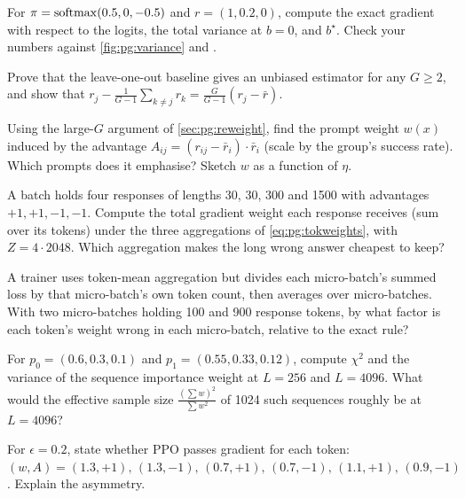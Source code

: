 \begin{exercise}
For $\pi=\operatorname{softmax}(0.5,0,-0.5)$ and $r=(1,0.2,0)$, compute the exact gradient with respect to the
logits, the total variance at $b=0$, and $b^\star$. Check your numbers against
\cref{fig:pg:variance} and .
\end{exercise}

\begin{exercise}
Prove that the leave-one-out baseline gives an unbiased estimator for any $G\ge2$, and show that
$r_j-\frac{1}{G-1}\sum_{k\ne j}r_k=\frac{G}{G-1}(r_j-\bar r)$.
\end{exercise}

\begin{exercise}
Using the large-$G$ argument of \cref{sec:pg:reweight}, find the prompt weight $w(x)$ induced by
the advantage $A_{ij}=(r_{ij}-\bar r_i)\cdot\bar r_i$ (scale by the group's success rate). Which
prompts does it emphasise? Sketch $w$ as a function of $\eta$.
\end{exercise}

\begin{exercise}
A batch holds four responses of lengths 30, 30, 300 and 1500 with advantages $+1,+1,-1,-1$.
Compute the total gradient weight each response receives (sum over its tokens) under the three
aggregations of \cref{eq:pg:tokweights}, with $Z=4\cdot2048$. Which aggregation makes the long
wrong answer cheapest to keep?
\end{exercise}

\begin{exercise}
A trainer uses token-mean aggregation but divides each micro-batch's summed loss by that
micro-batch's own token count, then averages over micro-batches. With two micro-batches
holding 100 and 900 response tokens, by what factor is each token's weight wrong in each
micro-batch, relative to the exact rule?
\end{exercise}

\begin{exercise}
For $p_0=(0.6,0.3,0.1)$ and $p_1=(0.55,0.33,0.12)$, compute $\chi^2$ and the variance of the
sequence importance weight at $L=256$ and $L=4096$. What would the effective sample size
$\frac{(\sum w)^2}{\sum w^2}$ of 1024 such sequences roughly be at $L=4096$?
\end{exercise}

\begin{exercise}
For $\epsilon=0.2$, state whether PPO passes gradient for each token:
$(w,A)=(1.3,+1),\,(1.3,-1),\,(0.7,+1),\,(0.7,-1),\,(1.1,+1),\,(0.9,-1)$. Explain the asymmetry.
\end{exercise}

